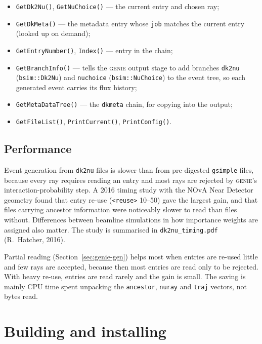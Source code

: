 \documentclass[11pt]{article}
\newcommand{\code}[1]{\texttt{#1}}
\newcommand{\genie}{\textsc{genie}\xspace}
\newcommand{\dktwonu}{\texttt{dk2nu}\xspace}
\newcommand{\sect}[1]{Section~\ref{sec:#1}}
\begin{document}
\begin{itemize}[nosep]
\item \code{GetDk2Nu()}, \code{GetNuChoice()} --- the current entry and
      chosen ray;
\item \code{GetDkMeta()} --- the metadata entry whose \code{job} matches
      the current entry (looked up on demand);
\item \code{GetEntryNumber()}, \code{Index()} --- entry in the chain;
\item \code{GetBranchInfo()} --- tells the \genie output stage to add
      branches \code{dk2nu} (\code{bsim::Dk2Nu}) and \code{nuchoice}
      (\code{bsim::NuChoice}) to the event tree, so each generated event
      carries its flux history;
\item \code{GetMetaDataTree()} --- the \code{dkmeta} chain, for copying
      into the output;
\item \code{GetFileList()}, \code{PrintCurrent()}, \code{PrintConfig()}.
\end{itemize}

\subsection{Performance}

Event generation from \dktwonu files is slower than from pre-digested
\code{gsimple} files, because every ray requires reading an entry and most
rays are rejected by \genie's interaction-probability step.  A 2016 timing
study with the NOvA Near Detector geometry found that entry re-use
(\code{<reuse>} 10--50) gave the largest gain, and that files carrying
ancestor information were noticeably slower to read than files without.
Differences between beamline simulations in how importance weights are
assigned also matter.  The study is summarised in \code{dk2nu\_timing.pdf}
(R.~Hatcher, 2016).

Partial reading (\sect{genie-gen}) helps most when entries are re-used
little and few rays are accepted, because then most entries are read only
to be rejected.  With heavy re-use, entries are read rarely and the gain is
small.  The saving is mainly CPU time spent unpacking the \code{ancestor},
\code{nuray} and \code{traj} vectors, not bytes read.

\appendix

\section{Building and installing}\label{app:build}
\end{document}
